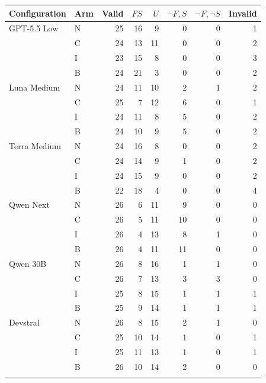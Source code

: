 \begin{tabular}{llrrrrrr}
\toprule
Configuration & Arm & Valid & $F S$ & $U$ & $\neg F,S$ & $\neg F,\neg S$ & Invalid\\
\midrule
GPT-5.5 Low & N & 25 & 16 & 9 & 0 & 0 & 1\\
 & C & 24 & 13 & 11 & 0 & 0 & 2\\
 & I & 23 & 15 & 8 & 0 & 0 & 3\\
 & B & 24 & 21 & 3 & 0 & 0 & 2\\
\addlinespace
Luna Medium & N & 24 & 11 & 10 & 2 & 1 & 2\\
 & C & 25 & 7 & 12 & 6 & 0 & 1\\
 & I & 24 & 11 & 8 & 5 & 0 & 2\\
 & B & 24 & 10 & 9 & 5 & 0 & 2\\
\addlinespace
Terra Medium & N & 24 & 16 & 8 & 0 & 0 & 2\\
 & C & 24 & 14 & 9 & 1 & 0 & 2\\
 & I & 24 & 15 & 9 & 0 & 0 & 2\\
 & B & 22 & 18 & 4 & 0 & 0 & 4\\
\addlinespace
Qwen Next & N & 26 & 6 & 11 & 9 & 0 & 0\\
 & C & 26 & 5 & 11 & 10 & 0 & 0\\
 & I & 26 & 4 & 13 & 8 & 1 & 0\\
 & B & 26 & 4 & 11 & 11 & 0 & 0\\
\addlinespace
Qwen 30B & N & 26 & 8 & 16 & 1 & 1 & 0\\
 & C & 26 & 7 & 13 & 3 & 3 & 0\\
 & I & 25 & 8 & 15 & 1 & 1 & 1\\
 & B & 25 & 9 & 14 & 1 & 1 & 1\\
\addlinespace
Devstral & N & 26 & 8 & 15 & 2 & 1 & 0\\
 & C & 25 & 10 & 14 & 1 & 0 & 1\\
 & I & 25 & 11 & 13 & 1 & 0 & 1\\
 & B & 26 & 10 & 14 & 2 & 0 & 0\\
\addlinespace
\bottomrule
\end{tabular}
